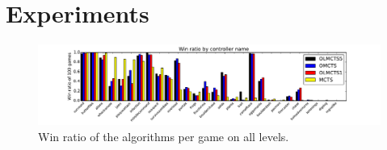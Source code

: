 \section{Experiments}
\label{sec:experiments}
\begin{figure}
	\centering
	\includegraphics[width=\textwidth]{includes/wins}
	\vspace{-.8cm}
	\caption{Win ratio of the algorithms per game on all levels.}
	\label{fig:wins}
\end{figure}

